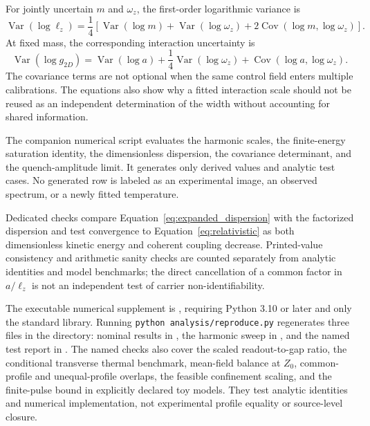 \documentclass[11pt,a4paper]{article}
\theoremstyle{definition}
\theoremstyle{remark}
\newcommand{\Var}{\operatorname{Var}}
\newcommand{\Cov}{\operatorname{Cov}}
\newcommand{\lop}{\ell_z}
\begin{document}
For jointly uncertain $m$ and $\omega_z$, the first-order logarithmic variance is
\begin{equation}
 \Var(\log\lop)=\frac14\left[
 \Var(\log m)+\Var(\log\omega_z)
 +2\Cov(\log m,\log\omega_z)\right].
 \label{eq:width_uncertainty}
\end{equation}
At fixed mass, the corresponding interaction uncertainty is
\begin{equation}
 \Var(\log g_{2D})
 =\Var(\log a)+\frac14\Var(\log\omega_z)
 +\Cov(\log a,\log\omega_z).
 \label{eq:coupling_uncertainty}
\end{equation}
The covariance terms are not optional when the same control field enters multiple calibrations. The equations also show why a fitted interaction scale should not be reused as an independent determination of the width without accounting for shared information.

The companion numerical script evaluates the harmonic scales, the finite-energy saturation identity, the dimensionless dispersion, the covariance determinant, and the quench-amplitude limit. It generates only derived values and analytic test cases. No generated row is labeled as an experimental image, an observed spectrum, or a newly fitted temperature.

Dedicated checks compare Equation~\eqref{eq:expanded_dispersion} with the factorized dispersion and test convergence to Equation~\eqref{eq:relativistic} as both dimensionless kinetic energy and coherent coupling decrease. Printed-value consistency and arithmetic sanity checks are counted separately from analytic identities and model benchmarks; the direct cancellation of a common factor in $a/\lop$ is not an independent test of carrier non-identifiability.

The executable numerical supplement is , requiring Python 3.10 or later and only the standard library. Running \texttt{python analysis/reproduce.py} regenerates three files in the  directory: nominal results in , the harmonic sweep in , and the named test report in . The named checks also cover the scaled readout-to-gap ratio, the conditional transverse thermal benchmark, mean-field balance at $Z_0$, common-profile and unequal-profile overlaps, the feasible confinement scaling, and the finite-pulse bound in explicitly declared toy models. They test analytic identities and numerical implementation, not experimental profile equality or source-level closure.
\end{document}
